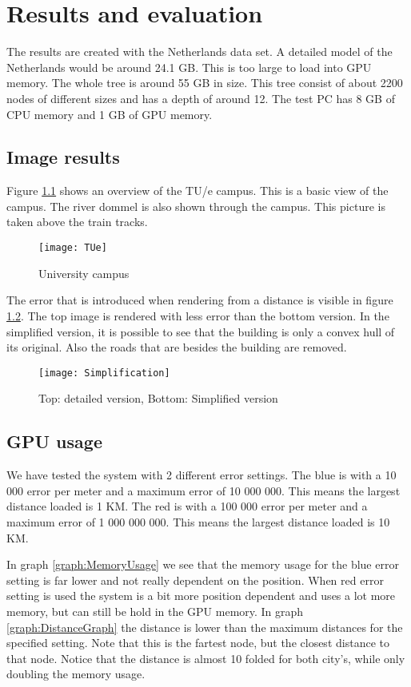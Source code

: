 \chapter{Results and evaluation}
\label{chap:ResultsAndEvaluation}
The results are created with the Netherlands data set. A detailed model of the Netherlands would be around 24.1 GB. This is too large to load into GPU memory. The whole tree is around 55 GB in size. This tree consist of about 2200 nodes of different sizes and has a depth of around 12. The test PC has 8 GB of CPU memory and 1 GB of GPU memory.

\section{Image results}
\label{sec:ImageResults}
Figure \ref{fig:UniversityCampus} shows an overview of the TU/e campus. This is a basic view of the campus. The river dommel is also shown through the campus. This picture is taken above the train tracks.

\begin{figure}[htb!]
\centering
\texttt{[image: TUe]}
\caption{University campus}
\label{fig:UniversityCampus}
\end{figure}

The error that is introduced when rendering from a distance is visible in figure \ref{fig:Simplification}. The top image is rendered with less error than the bottom version. In the simplified version, it is possible to see that the building is only a convex hull of its original. Also the roads that are besides the building are removed.

\begin{figure}[htb!]
\centering
\texttt{[image: Simplification]}
\caption{Top: detailed version, Bottom: Simplified version}
\label{fig:Simplification}
\end{figure}

\section{GPU usage}
\label{sec:GPUUsage}
We have tested the system with 2 different error settings. The blue is with a 10 000 error per meter and a maximum error of 10 000 000. This means the largest distance loaded is 1 KM. The red is with a 100 000 error per meter and a maximum error of 1 000 000 000. This means the largest distance loaded is 10 KM.

In graph \ref{graph:MemoryUsage} we see that the memory usage for the blue error setting is far lower and not really dependent on the position. When red error setting is used the system is a bit more position dependent and uses a lot more memory, but can still be hold in the GPU memory. In graph \ref{graph:DistanceGraph} the distance is lower than the maximum distances for the specified setting. Note that this is the fartest node, but the closest distance to that node. Notice that the distance is almost 10 folded for both city's, while only doubling the memory usage.

